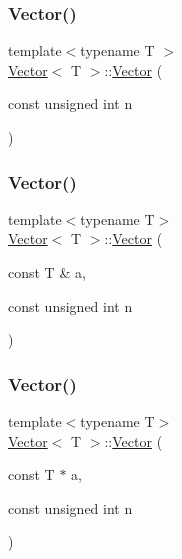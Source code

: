 \mbox{\label{classVector_a8575836acd6e8c9a2297b5ba6d14008c_a8575836acd6e8c9a2297b5ba6d14008c}} 
\subsubsection{\texorpdfstring{Vector()}{Vector()}\hspace{0.1cm}{\footnotesize\ttfamily [2/5]}}
{\footnotesize\ttfamily template$<$typename T $>$ \\
\mbox{\hyperlink{classVector}{Vector}}$<$ T $>$\+::\mbox{\hyperlink{classVector}{Vector}} (\begin{DoxyParamCaption}\item[{const unsigned int}]{n }\end{DoxyParamCaption})}

\mbox{\label{classVector_aa2bc8aac00503574bac8302652ef7ba0_aa2bc8aac00503574bac8302652ef7ba0}} 
\subsubsection{\texorpdfstring{Vector()}{Vector()}\hspace{0.1cm}{\footnotesize\ttfamily [3/5]}}
{\footnotesize\ttfamily template$<$typename T$>$ \\
\mbox{\hyperlink{classVector}{Vector}}$<$ T $>$\+::\mbox{\hyperlink{classVector}{Vector}} (\begin{DoxyParamCaption}\item[{const T \&}]{a,  }\item[{const unsigned int}]{n }\end{DoxyParamCaption})}

\mbox{\label{classVector_a62f06e9931e61437a5a5783eca0a9550_a62f06e9931e61437a5a5783eca0a9550}} 
\subsubsection{\texorpdfstring{Vector()}{Vector()}\hspace{0.1cm}{\footnotesize\ttfamily [4/5]}}
{\footnotesize\ttfamily template$<$typename T$>$ \\
\mbox{\hyperlink{classVector}{Vector}}$<$ T $>$\+::\mbox{\hyperlink{classVector}{Vector}} (\begin{DoxyParamCaption}\item[{const T $\ast$}]{a,  }\item[{const unsigned int}]{n }\end{DoxyParamCaption})}

